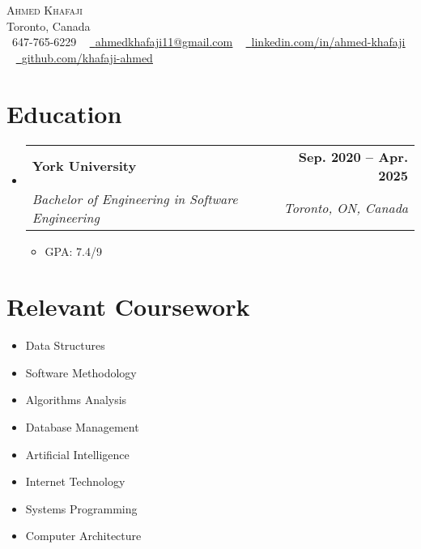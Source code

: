 \documentclass[letterpaper,11pt]{article}
\makeatletter
\newcommand{\resumeItem}[1]{
  \item\small{
    {#1 \vspace{-2pt}}
  }
}
\newcommand{\resumeSubheading}[4]{
  \vspace{-2pt}\item
    \begin{tabular*}{1.0\textwidth}[t]{l@{\extracolsep{\fill}}r}
      \textbf{#1} & \textbf{\small #2} \\
      \textit{\small#3} & \textit{\small #4} \\
    \end{tabular*}\vspace{-7pt}
}
\newcommand{\resumeSubHeadingListStart}{\begin{itemize}[leftmargin=0.0in, label={}]}
\newcommand{\resumeSubHeadingListEnd}{\end{itemize}}
\newcommand{\resumeItemListStart}{\begin{itemize}}
\newcommand{\resumeItemListEnd}{\end{itemize}\vspace{-5pt}}
\makeatother
\begin{document}
\begin{center}
    {\Huge \scshape Ahmed Khafaji} \\ \vspace{1pt}
    Toronto, Canada \\ \vspace{1pt}
    \small \raisebox{-0.1\height}\faPhone\ 647-765-6229 ~ 
    \href{mailto:ahmedkhafaji11@gmail.com}{\raisebox{-0.2\height}\faEnvelope\ \underline{ahmedkhafaji11@gmail.com}} ~ 
    \href{https://linkedin.com/in/ahmed-khafaji}{\raisebox{-0.2\height}\faLinkedin\ \underline{linkedin.com/in/ahmed-khafaji}}  ~
    \href{https://github.com/khafaji-ahmed}{\raisebox{-0.2\height}\faGithub\ \underline{github.com/khafaji-ahmed}}
    \vspace{-8pt}
\end{center}

\section{Education}
  \resumeSubHeadingListStart
    \resumeSubheading
      {York University}{Sep. 2020 -- Apr. 2025}
      {Bachelor of Engineering in Software Engineering}{Toronto, ON, Canada}
      \resumeItemListStart
        \resumeItem{GPA: 7.4/9}
      \resumeItemListEnd
  \resumeSubHeadingListEnd

\section{Relevant Coursework}
    \begin{multicols}{4}
        \begin{itemize}[itemsep=-5pt, parsep=3pt]
            \item\small Data Structures
            \item Software Methodology
            \item Algorithms Analysis
            \item Database Management
            \item Artificial Intelligence
            \item Internet Technology
            \item Systems Programming
            \item Computer Architecture
        \end{itemize}
    \end{multicols}
    
\end{document}
